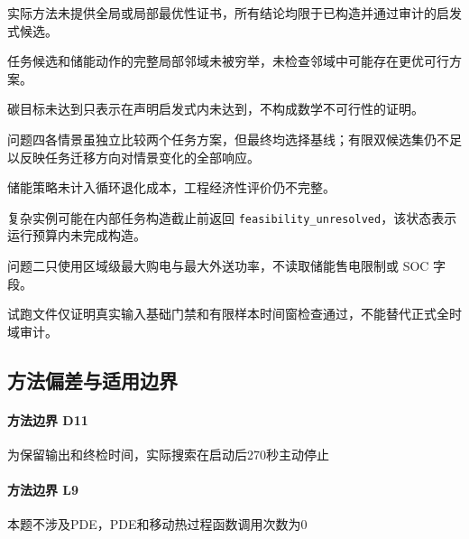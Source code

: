 实际方法未提供全局或局部最优性证书，所有结论均限于已构造并通过审计的启发式候选。

任务候选和储能动作的完整局部邻域未被穷举，未检查邻域中可能存在更优可行方案。

碳目标未达到只表示在声明启发式内未达到，不构成数学不可行性的证明。

问题四各情景虽独立比较两个任务方案，但最终均选择基线；有限双候选集仍不足以反映任务迁移方向对情景变化的全部响应。

储能策略未计入循环退化成本，工程经济性评价仍不完整。

复杂实例可能在内部任务构造截止前返回 \texttt{feasibility\_unresolved}，该状态表示运行预算内未完成构造。

问题二只使用区域级最大购电与最大外送功率，不读取储能售电限制或 SOC 字段。

试跑文件仅证明真实输入基础门禁和有限样本时间窗检查通过，不能替代正式全时域审计。


\subsection{方法偏差与适用边界}
\paragraph{方法边界 D11}为保留输出和终检时间，实际搜索在启动后270秒主动停止

\paragraph{方法边界 L9}本题不涉及PDE，PDE和移动热过程函数调用次数为0
